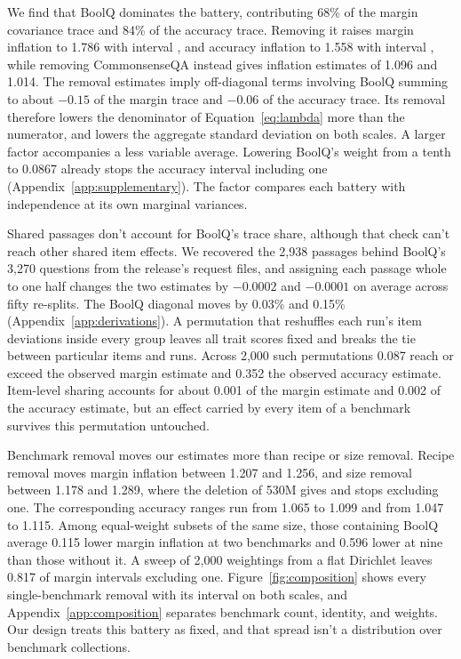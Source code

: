 We find that BoolQ dominates the battery, contributing 68\% of the margin covariance trace and 84\% of the accuracy trace. Removing it raises margin inflation to 1.786 with interval , and accuracy inflation to 1.558 with interval , while removing CommonsenseQA instead gives inflation estimates of 1.096 and 1.014. The removal estimates imply off-diagonal terms involving BoolQ summing to about $-0.15$ of the margin trace and $-0.06$ of the accuracy trace. Its removal therefore lowers the denominator of Equation~\ref{eq:lambda} more than the numerator, and lowers the aggregate standard deviation on both scales. A larger factor accompanies a less variable average. Lowering BoolQ's weight from a tenth to 0.0867 already stops the accuracy interval including one (Appendix~\ref{app:supplementary}). The factor compares each battery with independence at its own marginal variances.

Shared passages don't account for BoolQ's trace share, although that check can't reach other shared item effects. We recovered the 2,938 passages behind BoolQ's 3,270 questions from the release's request files, and assigning each passage whole to one half changes the two estimates by $-0.0002$ and $-0.0001$ on average across fifty re-splits. The BoolQ diagonal moves by 0.03\% and 0.15\% (Appendix~\ref{app:derivations}). A permutation that reshuffles each run's item deviations inside every group leaves all trait scores fixed and breaks the tie between particular items and runs. Across 2,000 such permutations 0.087 reach or exceed the observed margin estimate and 0.352 the observed accuracy estimate. Item-level sharing accounts for about 0.001 of the margin estimate and 0.002 of the accuracy estimate, but an effect carried by every item of a benchmark survives this permutation untouched.

Benchmark removal moves our estimates more than recipe or size removal. Recipe removal moves margin inflation between 1.207 and 1.256, and size removal between 1.178 and 1.289, where the deletion of 530M gives  and stops excluding one. The corresponding accuracy ranges run from 1.065 to 1.099 and from 1.047 to 1.115. Among equal-weight subsets of the same size, those containing BoolQ average 0.115 lower margin inflation at two benchmarks and 0.596 lower at nine than those without it. A sweep of 2,000 weightings from a flat Dirichlet leaves 0.817 of margin intervals excluding one. Figure~\ref{fig:composition} shows every single-benchmark removal with its interval on both scales, and Appendix~\ref{app:composition} separates benchmark count, identity, and weights. Our design treats this battery as fixed, and that spread isn't a distribution over benchmark collections.

